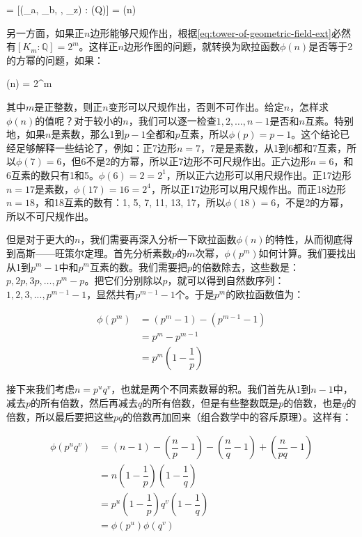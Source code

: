 \be
[K_m : \mathbb{Q}] = [(\zeta_a, \zeta_b, \dotsc, \zeta_z) : \mathbb(Q)] = \phi(n)
\ee

另一方面，如果正$n$边形能够尺规作出，根据\cref{eq:tower-of-geometric-field-ext}必然有$[K_m : \mathbb{Q}] = 2^m$。这样正$n$边形作图的问题，就转换为欧拉函数$\phi(n)$是否等于2的方幂的问题，如果：

\be
\phi(n) = 2^m
\label{eq:euler-function-as-power-of-2}
\ee

其中$m$是正整数，则正$n$变形可以尺规作出，否则不可作出。给定$n$，怎样求$\phi(n)$的值呢？对于较小的$n$，我们可以逐一检查$1, 2, \dotsc, n - 1$是否和$n$互素。特别地，如果$n$是素数，那么1到$p-1$全都和$p$互素，所以$\phi(p) = p - 1$。这个结论已经足够解释一些结论了，例如：正7边形$n = 7$，7是是素数，从1到6都和7互素，所以$\phi(7) = 6$，但6不是2的方幂，所以正7边形不可尺规作出。正六边形$n = 6$，和6互素的数只有1和5。$\phi(6) = 2 = 2^1$，所以正六边形可以用尺规作出。正17边形$n = 17$是素数，$\phi(17) = 16 = 2^4$，所以正17边形可以用尺规作出。而正18边形$n = 18$，和18互素的数有：1, 5, 7, 11, 13, 17，所以$\phi(18) = 6$，不是2的方幂，所以不可尺规作出。

但是对于更大的$n$，我们需要再深入分析一下欧拉函数$\phi(n)$的特性，从而彻底得到高斯——旺策尔定理。首先分析素数$p$的$m$次幂，$\phi(p^m)$如何计算。我们要找出从1到$p^m-1$中和$p^m$互素的数。我们需要把$p$的倍数除去，这些数是：$p, 2p, 3p, \dotsc, p^m - p$。把它们分别除以$p$，就可以得到自然数序列：$1, 2, 3, ..., p^{m-1} - 1$，显然共有$p^{m-1} - 1$个。于是$p^m$的欧拉函数值为：

\begin{align*}
\phi(p^m) &= (p^m - 1) - (p^{m-1} - 1) \\
            &= p^m - p^{m-1} \\
            &= p^m(1-\dfrac{1}{p})
\end{align*}

接下来我们考虑$n = p^uq^v$，也就是两个不同素数幂的积。我们首先从1到$n-1$中，减去$p$的所有倍数，然后再减去$q$的所有倍数，但是有些整数既是$p$的倍数，也是$q$的倍数，所以最后要把这些$pq$的倍数再加回来（组合数学中的容斥原理）。这样有：

\begin{align*}
\phi(p^uq^v) &=  (n - 1) - (\dfrac{n}{p} - 1) - (\dfrac{n}{q} - 1) + (\dfrac{n}{pq} - 1) \\
          &=  n(1 - \dfrac{1}{p})(1 - \dfrac{1}{q}) \\[5pt]
          &=  p^u(1 - \dfrac{1}{p})q^v(1 - \dfrac{1}{q}) \\[5pt]
          &=  \phi(p^u)\phi(q^v)
\end{align*}


